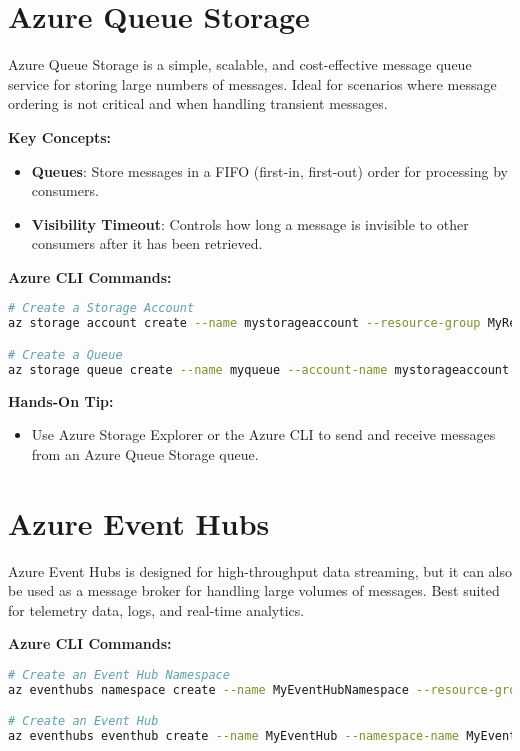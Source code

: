 \documentclass{article}
\begin{document}
\section{Azure Queue Storage}
Azure Queue Storage is a simple, scalable, and cost-effective message queue service for storing large numbers of messages. Ideal for scenarios where message ordering is not critical and when handling transient messages.

\textbf{Key Concepts:}
\begin{itemize}
    \item \textbf{Queues}: Store messages in a FIFO (first-in, first-out) order for processing by consumers.
    \item \textbf{Visibility Timeout}: Controls how long a message is invisible to other consumers after it has been retrieved.
\end{itemize}

\textbf{Azure CLI Commands:}
\begin{lstlisting}[language=bash]
# Create a Storage Account
az storage account create --name mystorageaccount --resource-group MyResourceGroup --location eastus --sku Standard_LRS

# Create a Queue
az storage queue create --name myqueue --account-name mystorageaccount
\end{lstlisting}

\textbf{Hands-On Tip:}
\begin{itemize}
    \item Use Azure Storage Explorer or the Azure CLI to send and receive messages from an Azure Queue Storage queue.
\end{itemize}

\section{Azure Event Hubs}
Azure Event Hubs is designed for high-throughput data streaming, but it can also be used as a message broker for handling large volumes of messages. Best suited for telemetry data, logs, and real-time analytics.

\textbf{Azure CLI Commands:}
\begin{lstlisting}[language=bash]
# Create an Event Hub Namespace
az eventhubs namespace create --name MyEventHubNamespace --resource-group MyResourceGroup --location eastus

# Create an Event Hub
az eventhubs eventhub create --name MyEventHub --namespace-name MyEventHubNamespace --resource-group MyResourceGroup
\end{lstlisting}
\end{document}
